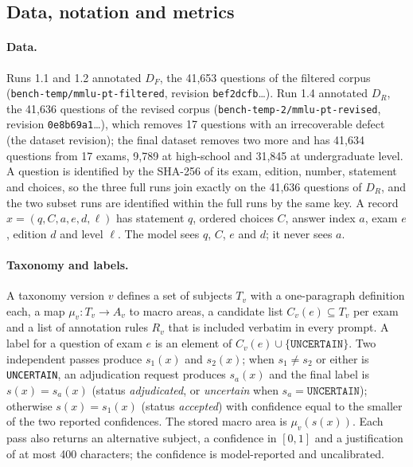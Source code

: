 \subsection{Data, notation and metrics}
\label{app:ka-setup}

\paragraph{Data.} Runs 1.1 and 1.2 annotated $D_F$, the 41,653 questions of
the filtered corpus (\texttt{bench-temp/mmlu-pt-filtered}, revision
\texttt{bef2dcfb}\ldots). Run 1.4 annotated $D_R$, the 41,636 questions of the
revised corpus (\texttt{bench-temp-2/mmlu-pt-revised}, revision
\texttt{0e8b69a1}\ldots), which removes 17 questions with an irrecoverable
defect (the dataset revision); the final dataset removes two more and
has 41,634 questions from 17 exams, 9,789 at high-school and 31,845 at
undergraduate level. A question is identified by the SHA-256 of its exam,
edition, number, statement and choices, so the three full runs join exactly
on the 41,636 questions of $D_R$, and the two subset runs are identified
within the full runs by the same key. A record $x=(q,C,a,e,d,\ell)$ has
statement $q$, ordered choices $C$, answer index $a$, exam $e$, edition $d$
and level $\ell$. The model sees $q$, $C$, $e$ and $d$; it never sees $a$.

\paragraph{Taxonomy and labels.} A taxonomy version $v$ defines a set of
subjects $T_v$ with a one-paragraph definition each, a map
$\mu_v\colon T_v\to A_v$ to macro areas, a candidate list $C_v(e)\subseteq
T_v$ per exam and a list of annotation rules $R_v$ that is included verbatim
in every prompt. A label for a question of exam $e$ is an element of
$C_v(e)\cup\{\texttt{UNCERTAIN}\}$. Two independent passes produce $s_1(x)$
and $s_2(x)$; when $s_1\neq s_2$ or either is \texttt{UNCERTAIN}, an
adjudication request produces $s_a(x)$ and the final label is $s(x)=s_a(x)$
(status \emph{adjudicated}, or \emph{uncertain} when $s_a=\texttt{UNCERTAIN}$);
otherwise $s(x)=s_1(x)$ (status \emph{accepted}) with confidence equal to the
smaller of the two reported confidences. The stored macro area is
$\mu_v(s(x))$. Each pass also returns an alternative subject, a confidence in
$[0,1]$ and a justification of at most 400 characters; the confidence is
model-reported and uncalibrated.

